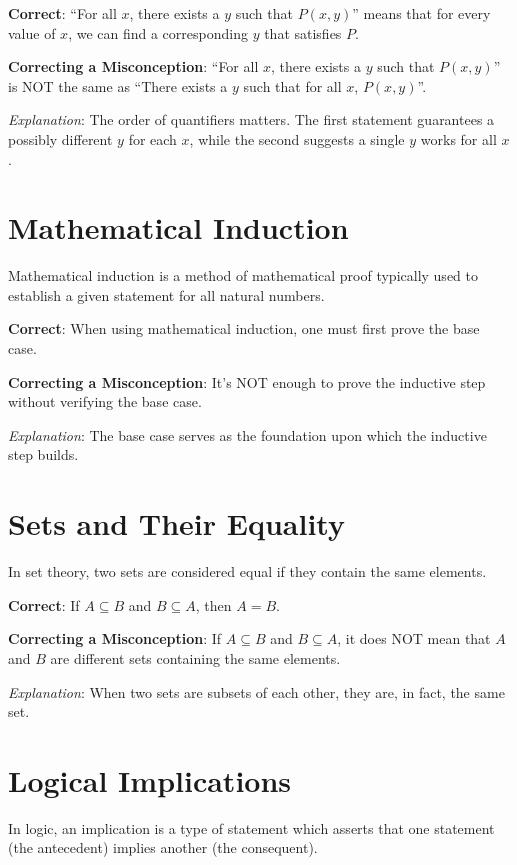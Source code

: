 \documentclass[12pt]{article}
\begin{document}
\textbf{Correct}: ``For all \(x\), there exists a \(y\) such that \(P(x,y)\)'' means that for every value of \(x\), we can find a corresponding \(y\) that satisfies \(P\).

\textbf{Correcting a Misconception}: ``For all \(x\), there exists a \(y\) such that \(P(x,y)\)'' is NOT the same as ``There exists a \(y\) such that for all \(x\), \(P(x,y)\)''.

\textit{Explanation}: The order of quantifiers matters. The first statement guarantees a possibly different \(y\) for each \(x\), while the second suggests a single \(y\) works for all \(x\).

\section*{Mathematical Induction}

Mathematical induction is a method of mathematical proof typically used to establish a given statement for all natural numbers.

\textbf{Correct}: When using mathematical induction, one must first prove the base case.

\textbf{Correcting a Misconception}: It's NOT enough to prove the inductive step without verifying the base case.

\textit{Explanation}: The base case serves as the foundation upon which the inductive step builds.

\section*{Sets and Their Equality}

In set theory, two sets are considered equal if they contain the same elements.

\textbf{Correct}: If \(A \subseteq B\) and \(B \subseteq A\), then \(A = B\).

\textbf{Correcting a Misconception}: If \(A \subseteq B\) and \(B \subseteq A\), it does NOT mean that \(A\) and \(B\) are different sets containing the same elements.

\textit{Explanation}: When two sets are subsets of each other, they are, in fact, the same set.

\section*{Logical Implications}

In logic, an implication is a type of statement which asserts that one statement (the antecedent) implies another (the consequent).
\end{document}
